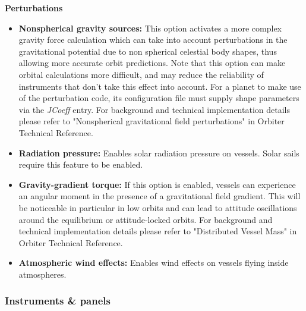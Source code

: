 \documentclass[Orbiter User Manual.tex]{subfiles}
\begin{document}
\textbf{Perturbations}
\begin{itemize}
\item \textbf{Nonspherical gravity sources:} This option activates a more complex gravity force calculation which can take into account perturbations in the gravitational potential due to non spherical celestial body shapes, thus allowing more accurate orbit predictions. Note that this option can make orbital calculations more difficult, and may reduce the reliability of instruments that don't take this effect into account. For a planet to make use of the perturbation code, its configuration file must supply shape parameters via the \textit{JCoeff} entry. For background and technical implementation details please refer to "Nonspherical gravitational field perturbations" in Orbiter Technical Reference.
\item \textbf{Radiation pressure:} Enables solar radiation pressure on vessels. Solar sails require this feature to be enabled.
\item \textbf{Gravity-gradient torque:} If this option is enabled, vessels can experience an angular moment in the presence of a gravitational field gradient. This will be noticeable in particular in low orbits and can lead to attitude oscillations around the equilibrium or attitude-locked orbits. For background and technical implementation details please refer to "Distributed Vessel Mass" in Orbiter Technical Reference.
\item \textbf{Atmospheric wind effects:} Enables wind effects on vessels flying inside atmospheres.
\end{itemize}

\subsubsection{Instruments \& panels}
\begin{figure}[H]
	\centering
\end{figure}
\end{document}
